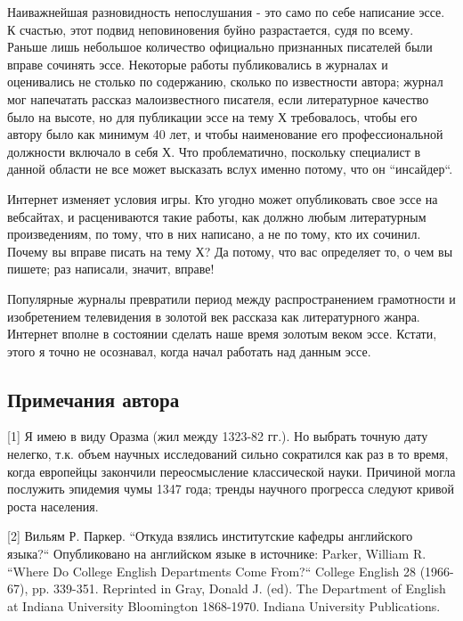 \documentclass[ebook,12pt,oneside,openany]{memoir}
\begin{document}
Наиважнейшая разновидность непослушания - это само по себе написание
эссе. К счастью, этот подвид неповиновения буйно разрастается, судя по
всему. Раньше лишь небольшое количество официально признанных
писателей были вправе сочинять эссе. Некоторые работы публиковались в
журналах и оценивались не столько по содержанию, сколько по
известности автора; журнал мог напечатать рассказ малоизвестного
писателя, если литературное качество было на высоте, но для публикации
эссе на тему Х требовалось, чтобы его автору было как минимум 40 лет,
и чтобы наименование его профессиональной должности включало в себя Х.
Что проблематично, поскольку специалист в данной области не все может
высказать вслух именно потому, что он ``инсайдер``. \newline

Интернет изменяет условия игры. Кто угодно может опубликовать свое
эссе на вебсайтах, и расцениваются такие работы, как должно любым
литературным произведениям, по тому, что в них написано, а не по тому,
кто их сочинил. Почему вы вправе писать на тему Х? Да потому, что вас
определяет то, о чем вы пишете; раз написали, значит, вправе! \newline

Популярные журналы превратили период между распространением
грамотности и изобретением телевидения в золотой век рассказа как
литературного жанра. Интернет вполне в состоянии сделать наше время
золотым веком эссе. Кстати, этого я точно не осознавал, когда начал
работать над данным эссе. \newline

\subsection{Примечания автора}

[1] Я имею в виду Оразма (жил между 1323-82 гг.). Но выбрать точную
дату нелегко, т.к. объем научных исследований сильно сократился как
раз в то время, когда европейцы закончили переосмысление классической
науки. Причиной могла послужить эпидемия чумы 1347 года; тренды
научного прогресса следуют кривой роста населения. \newline

[2] Вильям Р. Паркер. ``Откуда взялись институтские кафедры
английского языка?`` Опубликовано на английском языке в источнике:
Parker, William R. ``Where Do College English Departments Come From?``
College English 28 (1966-67), pp. 339-351. Reprinted in Gray, Donald
J. (ed). The Department of English at Indiana University Bloomington
1868-1970. Indiana University Publications. \newline
\end{document}
